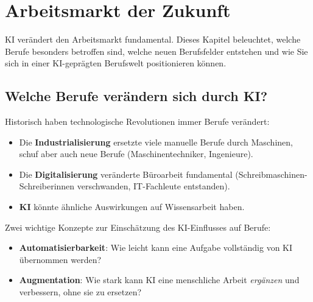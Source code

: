 \chapter{Arbeitsmarkt der Zukunft}\label{ch:K07_Arbeitsmarkt}

\begin{myremark}
KI verändert den Arbeitsmarkt fundamental. Dieses Kapitel beleuchtet, welche Berufe
besonders betroffen sind, welche neuen Berufsfelder entstehen und wie Sie sich in
einer KI-geprägten Berufswelt positionieren können.
\end{myremark}

\section{Welche Berufe verändern sich durch KI?}

\begin{myexample}
Historisch haben technologische Revolutionen immer Berufe verändert:
\begin{itemize}
    \item Die \textbf{Industrialisierung} ersetzte viele manuelle Berufe durch
          Maschinen, schuf aber auch neue Berufe (Maschinentechniker, Ingenieure).
    \item Die \textbf{Digitalisierung} veränderte Büroarbeit fundamental
          (Schreibmaschinen-Schreiberinnen verschwanden, IT-Fachleute entstanden).
    \item \textbf{KI} könnte ähnliche Auswirkungen auf Wissensarbeit haben.
\end{itemize}
\end{myexample}

\begin{mydefinition}
Zwei wichtige Konzepte zur Einschätzung des KI-Einflusses auf Berufe:
\begin{itemize}
    \item \textbf{Automatisierbarkeit}: Wie leicht kann eine Aufgabe vollständig
          von KI übernommen werden?
    \item \textbf{Augmentation}: Wie stark kann KI eine menschliche Arbeit
          \emph{ergänzen} und verbessern, ohne sie zu ersetzen?
\end{itemize}
\end{mydefinition}

